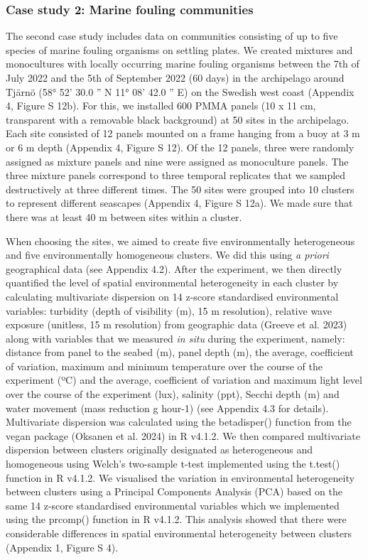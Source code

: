 \documentclass[
  letterpaper,
  DIV=11,
  numbers=noendperiod]{scrartcl}
\begin{document}
\subsubsection{Case study 2: Marine fouling
communities}\label{case-study-2-marine-fouling-communities}

The second case study includes data on communities consisting of up to
five species of marine fouling organisms on settling plates. We created
mixtures and monocultures with locally occurring marine fouling
organisms between the 7th of July 2022 and the 5th of September 2022 (60
days) in the archipelago around Tjärnö (58° 52' 30.0 '' N 11° 08' 42.0
'' E) on the Swedish west coast (Appendix 4, Figure S 12b). For this, we
installed 600 PMMA panels (10 x 11 cm, transparent with a removable
black background) at 50 sites in the archipelago. Each site consisted of
12 panels mounted on a frame hanging from a buoy at 3 m or 6 m depth
(Appendix 4, Figure S 12). Of the 12 panels, three were randomly
assigned as mixture panels and nine were assigned as monoculture panels.
The three mixture panels correspond to three temporal replicates that we
sampled destructively at three different times. The 50 sites were
grouped into 10 clusters to represent different seascapes (Appendix 4,
Figure S 12a). We made sure that there was at least 40 m between sites
within a cluster.

When choosing the sites, we aimed to create five environmentally
heterogeneous and five environmentally homogeneous clusters. We did this
using \emph{a priori} geographical data (see Appendix 4.2). After the
experiment, we then directly quantified the level of spatial
environmental heterogeneity in each cluster by calculating multivariate
dispersion on 14 z-score standardised environmental variables: turbidity
(depth of visibility (m), 15 m resolution), relative wave exposure
(unitless, 15 m resolution) from geographic data (Greeve et al. 2023)
along with variables that we measured \emph{in situ} during the
experiment, namely: distance from panel to the seabed (m), panel depth
(m), the average, coefficient of variation, maximum and minimum
temperature over the course of the experiment (ºC) and the average,
coefficient of variation and maximum light level over the course of the
experiment (lux), salinity (ppt), Secchi depth (m) and water movement
(mass reduction g hour-1) (see Appendix 4.3 for details). Multivariate
dispersion was calculated using the betadisper() function from the vegan
package (Oksanen et al. 2024) in R v4.1.2. We then compared multivariate
dispersion between clusters originally designated as heterogeneous and
homogeneous using Welch's two-sample t-test implemented using the
t.test() function in R v4.1.2. We visualised the variation in
environmental heterogeneity between clusters using a Principal
Components Analysis (PCA) based on the same 14 z-score standardised
environmental variables which we implemented using the prcomp() function
in R v4.1.2. This analysis showed that there were considerable
differences in spatial environmental heterogeneity between clusters
(Appendix 1, Figure S 4).
\end{document}
